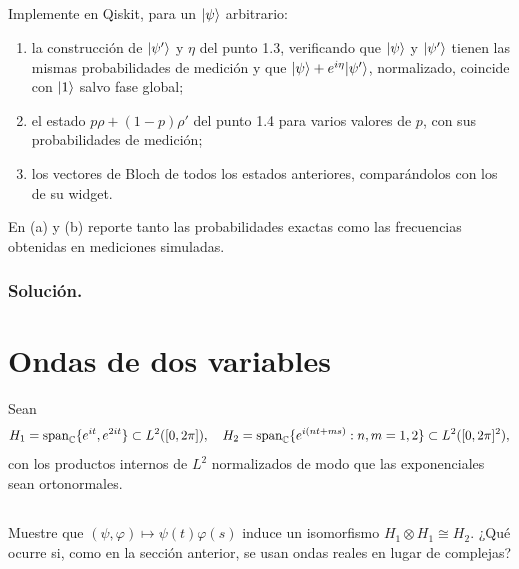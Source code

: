 \documentclass[12pt]{article}
\begin{document}


\color{rojoUN}

\subsection{}

Implemente en Qiskit, para un $\lvert \psi\rangle$ arbitrario:
    \begin{enumerate}[label=(\alph*)]
        \item la construcción de $\lvert \psi'\rangle$ y $\eta$ del punto 1.3, verificando que $\lvert \psi\rangle$ y $\lvert \psi'\rangle$ tienen las mismas probabilidades de medición y que $\lvert \psi\rangle + e^{i\eta}\lvert \psi'\rangle$, normalizado, coincide con $\lvert 1\rangle$ salvo fase global;
        \item el estado $p\rho + (1-p)\rho'$ del punto 1.4 para varios valores de $p$, con sus probabilidades de medición;
        \item los vectores de Bloch de todos los estados anteriores, comparándolos con los de su widget.
    \end{enumerate}
    En (a) y (b) reporte tanto las probabilidades exactas como las frecuencias obtenidas en mediciones simuladas.

\color{Black}

\subsubsection*{Solución.}




\color{rojoUN}

\section{Ondas de dos variables}

Sean
\[
H_1 = \text{span}_{\mathbb{C}}\{e^{it}, e^{2it}\} \subset L^2([0,2\pi]), \quad H_2 = \text{span}_{\mathbb{C}}\{e^{i(nt+ms)} : n,m=1,2\} \subset L^2([0,2\pi]^2),
\]
con los productos internos de $L^2$ normalizados de modo que las exponenciales sean ortonormales.

\subsection{}

Muestre que $(\psi,\varphi) \mapsto \psi(t)\varphi(s)$ induce un isomorfismo $H_1 \otimes H_1 \cong H_2$. ¿Qué ocurre si, como en la sección anterior, se usan ondas reales en lugar de complejas?
\end{document}
